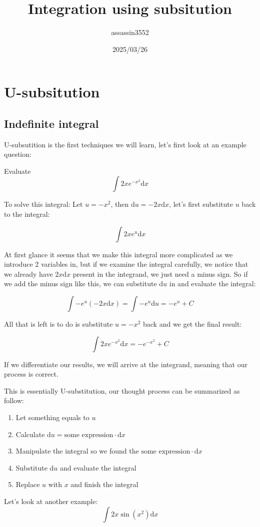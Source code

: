 \documentclass{article}
\title{Integration using subsitution}
\author{assassin3552}
\date{2025/03/26}
\numberwithin{equation}{section}
\begin{document}
\maketitle

\section{U-subsitution}
\subsection{Indefinite integral}
U-subsutition is the first techniques we will learn, let's first look at an example question:

Evaluate
\[
\int 2x e^{-x^2} \mathrm{d}x
\]

To solve this integral: Let $u = -x^2$, then $\mathrm{d}u = -2x \mathrm{d}x$, let's first substitute $u$ back to the integral:

\[
\int 2x e^u \mathrm{d}x
\]

At first glance it seems that we make this integral more complicated as we introduce 2 variables in,
but if we examine the integral carefully, we notice that we already have $2x\mathrm{d}x$ present in the integrand, we just need a minus sign.
So if we add the minus sign like this, we can substitute $\mathrm{d}u$ in and evaluate the integral:

\[
\int - e^u(-2x \mathrm{d}x) = \int -e^u \mathrm{d}u = -e^u+C
\]

All that is left is to do is substitute $u=-x^2$ back and we get the final result:

\[
\int 2xe^{-x^2} \mathrm{d}x = -e^{-x^2}+C
\]

If we differentiate our results, we will arrive at the integrand, meaning that our process is correct.

This is essentially U-substitution, our thought process can be summarized as follow:
\begin{enumerate}
    \item Let something equals to $u$
    \item Calculate $\mathrm{d}u = \text{some expression} \cdot \mathrm{d}x$
    \item Manipulate the integral so we found the $\text{some expression} \cdot \mathrm{d}x$
    \item Substitute $\mathrm{d}u$ and evaluate the integral
    \item Replace $u$ with $x$ and finish the integral
\end{enumerate}

\newpage
Let's look at another example:
\[
\int 2x \sin(x^2) \mathrm{d}x
\]
\end{document}
